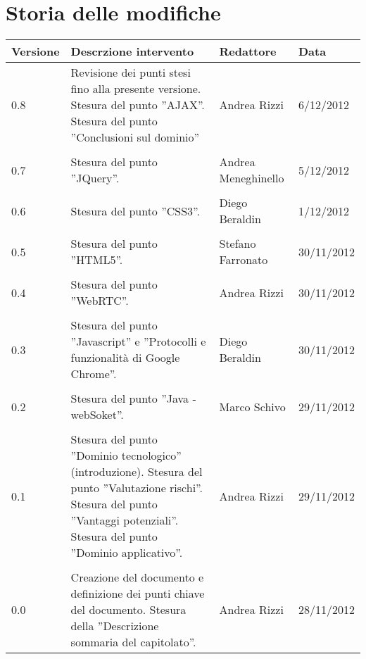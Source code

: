\section*{Storia delle modifiche}
\begin{tabularx}{\textwidth}{lXll}
\toprule
Versione & Descrzione intervento & Redattore & Data\\
\midrule %
0.8 & Revisione dei punti stesi fino alla presente versione. Stesura del punto ''AJAX''. Stesura del punto ''Conclusioni sul dominio'' & Andrea Rizzi & 6/12/2012\\\\
0.7 & Stesura del punto ''JQuery''. & Andrea Meneghinello & 5/12/2012\\\\
0.6 & Stesura del punto ''CSS3''. & Diego Beraldin & 1/12/2012\\\\
0.5 & Stesura del punto ''HTML5''. & Stefano Farronato & 30/11/2012\\\\
0.4 & Stesura del punto ''WebRTC''. & Andrea Rizzi & 30/11/2012\\\\
0.3 & Stesura del punto ''Javascript'' e ''Protocolli e funzionalità di Google Chrome''.  & Diego Beraldin & 30/11/2012\\\\
0.2 & Stesura del punto ''Java - webSoket''.  & Marco Schivo & 29/11/2012\\\\
0.1 & Stesura del punto ''Dominio tecnologico'' (introduzione). Stesura del punto ''Valutazione rischi''. Stesura del punto ''Vantaggi potenziali''. Stesura del punto ''Dominio applicativo''.  & Andrea Rizzi & 29/11/2012\\\\
0.0 & Creazione del documento e definizione dei punti chiave del documento. Stesura della ''Descrizione sommaria del capitolato''. & Andrea Rizzi & 28/11/2012\\
\bottomrule
\end{tabularx}
\newpage



\setcounter{page}{1}
\pagestyle{normal}





